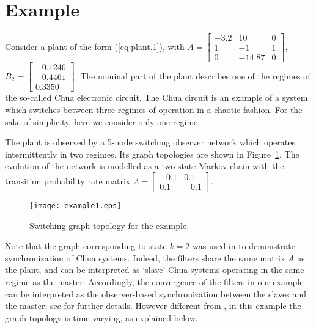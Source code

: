 \documentclass[a4paper,twocolumn]{autart}
\begin{document}
\section{Example}\label{Example}
Consider a plant of the form (\ref{eq:plant.1}), with 
$
A=\left[\begin{smallmatrix}
   -3.2 &  10    &  0\\
    1   &  -1    &  1 \\
    0   & -14.87 &  0
  \end{smallmatrix}
\right]$, \quad
$B_2=\left[\begin{smallmatrix}
    -0.1246 \\
   -0.4461 \\
    0.3350 
  \end{smallmatrix}
\right]$.
The nominal part of the plant describes one of the regimes of the so-called
Chua electronic circuit. The Chua circuit is an example of a system which
switches between three regimes of operation in a chaotic
fashion. For the sake of simplicity, here we consider only one regime.

The plant is observed by a 5-node switching observer network which
operates intermittently in two regimes. Its graph topologies are shown in
Figure~\ref{fig.ex}. The evolution of the network is modelled as
a two-state Markov chain with the transition probability rate matrix
$\Lambda=\left[\begin{smallmatrix}
-0.1 & 0.1 \\ 0.1 & -0.1
  \end{smallmatrix}
\right]$.
  \begin{figure}
\centering
  \texttt{[image: example1.eps]}
  \caption{Switching graph topology for the example.}
  \label{fig.ex}
\end{figure}
Note that the graph corresponding to state $k=2$ was used in
\cite{U6,YGH-2009} to demonstrate synchronization of Chua systems. Indeed,
the filters share the same 
matrix $A$ as the plant, and can be interpreted as `slave' Chua systems operating in the same regime as the master. Accordingly, the convergence of the filters
in our example can be interpreted as the observer-based
synchronization between the slaves and the master; see \cite{U6} for further
details. However different from \cite{U6}, in this example the graph topology
is time-varying, as explained below.
\end{document}
